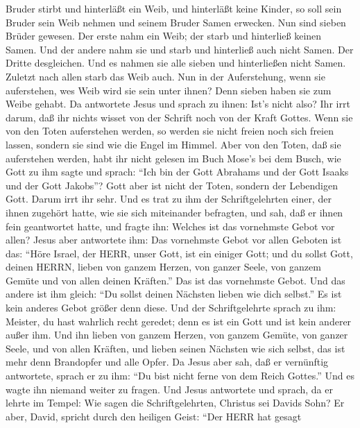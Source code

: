 Bruder stirbt und hinterläßt ein Weib, und hinterläßt keine Kinder, so
soll sein Bruder sein Weib nehmen und seinem Bruder Samen erwecken.
 Nun sind sieben Brüder gewesen. Der erste nahm ein Weib;
der starb und hinterließ keinen Samen.  Und der andere nahm
sie und starb und hinterließ auch nicht Samen. Der Dritte desgleichen.
 Und es nahmen sie alle sieben und hinterließen nicht
Samen. Zuletzt nach allen starb das Weib auch.  Nun in der
Auferstehung, wenn sie auferstehen, wes Weib wird sie sein unter ihnen?
Denn sieben haben sie zum Weibe gehabt.  Da antwortete
Jesus und sprach zu ihnen: Ist's nicht also? Ihr irrt darum, daß ihr
nichts wisset von der Schrift noch von der Kraft Gottes. 
Wenn sie von den Toten auferstehen werden, so werden sie nicht freien
noch sich freien lassen, sondern sie sind wie die Engel im Himmel.
 Aber von den Toten, daß sie auferstehen werden, habt ihr
nicht gelesen im Buch Mose's bei dem Busch, wie Gott zu ihm sagte und
sprach: ``Ich bin der Gott Abrahams und der Gott Isaaks und der Gott
Jakobs''?  Gott aber ist nicht der Toten, sondern der
Lebendigen Gott. Darum irrt ihr sehr.  Und es trat zu ihm
der Schriftgelehrten einer, der ihnen zugehört hatte, wie sie sich
miteinander befragten, und sah, daß er ihnen fein geantwortet hatte, und
fragte ihn: Welches ist das vornehmste Gebot vor allen? 
Jesus aber antwortete ihm: Das vornehmste Gebot vor allen Geboten ist
das: ``Höre Israel, der HERR, unser Gott, ist ein einiger Gott;
 und du sollst Gott, deinen HERRN, lieben von ganzem
Herzen, von ganzer Seele, von ganzem Gemüte und von allen deinen
Kräften.'' Das ist das vornehmste Gebot.  Und das andere
ist ihm gleich: ``Du sollst deinen Nächsten lieben wie dich selbst.'' Es
ist kein anderes Gebot größer denn diese.  Und der
Schriftgelehrte sprach zu ihm: Meister, du hast wahrlich recht geredet;
denn es ist ein Gott und ist kein anderer außer ihm.  Und
ihn lieben von ganzem Herzen, von ganzem Gemüte, von ganzer Seele, und
von allen Kräften, und lieben seinen Nächsten wie sich selbst, das ist
mehr denn Brandopfer und alle Opfer.  Da Jesus aber sah,
daß er vernünftig antwortete, sprach er zu ihm: ``Du bist nicht ferne
von dem Reich Gottes.'' Und es wagte ihn niemand weiter zu fragen.
 Und Jesus antwortete und sprach, da er lehrte im Tempel:
Wie sagen die Schriftgelehrten, Christus sei Davids Sohn? 
Er aber, David, spricht durch den heiligen Geist: ``Der HERR hat gesagt
